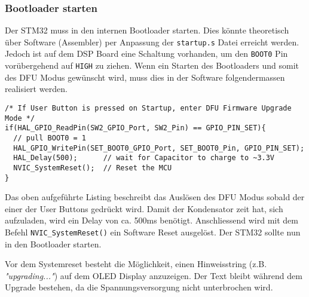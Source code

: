 \subsubsection{Bootloader starten}
\label{sec:Enter_DFU}

Der STM32 muss in den internen Bootloader starten. Dies könnte theoretisch über Software (Assembler) per Anpassung der \texttt{startup.s} Datei erreicht werden.
Jedoch ist auf dem DSP Board eine Schaltung vorhanden, um den \texttt{BOOT0} Pin vorübergehend auf \texttt{HIGH} zu ziehen.
Wenn ein Starten des Bootloaders und somit des DFU Modus gewünscht wird, muss dies in der Software folgendermassen realisiert werden.

\begin{lstlisting}[style=Cuvision,caption={Starten des Bootloaders durch CPU Reset}]
/* If User Button is pressed on Startup, enter DFU Firmware Upgrade Mode */
if(HAL_GPIO_ReadPin(SW2_GPIO_Port, SW2_Pin) == GPIO_PIN_SET){
  // pull BOOT0 = 1
  HAL_GPIO_WritePin(SET_BOOT0_GPIO_Port, SET_BOOT0_Pin, GPIO_PIN_SET);
  HAL_Delay(500);      // wait for Capacitor to charge to ~3.3V
  NVIC_SystemReset();  // Reset the MCU
}
\end{lstlisting}

Das oben aufgeführte Listing beschreibt das Auslösen des DFU Modus sobald der einer der User Buttons gedrückt wird.
Damit der Kondensator zeit hat, sich aufzuladen, wird ein Delay von ca. 500ms benötigt.
Anschliessend wird mit dem Befehl \texttt{NVIC\_SystemReset()} ein Software Reset ausgelöst.
Der STM32 sollte nun in den Bootloader starten.

Vor dem Systemreset besteht die Möglichkeit, einen Hinweisstring (z.B. \textit{"upgrading..."}) auf dem OLED Display anzuzeigen.
Der Text bleibt während dem Upgrade bestehen, da die Spannungsversorgung nicht unterbrochen wird.



